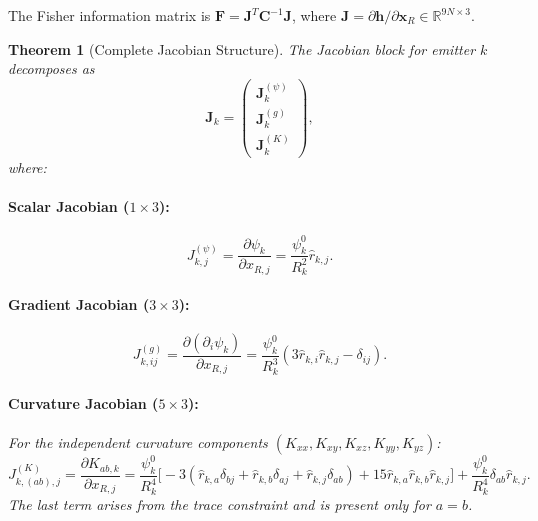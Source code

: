 \documentclass[twocolumn,superscriptaddress,prd,nofootinbib]{revtex4-2}
\newcommand{\FIM}{\mathbf{F}}
\newcommand{\xvec}{\mathbf{x}}
\newtheorem{theorem}{Theorem}
\begin{document}
The Fisher information matrix is
$\FIM = \mathbf{J}^T \mathbf{C}^{-1} \mathbf{J}$, where
$\mathbf{J} = \partial\mathbf{h}/\partial\xvec_R \in \mathbb{R}^{9N\times 3}$.

\begin{theorem}[Complete Jacobian Structure]\label{thm:jacobian}
The Jacobian block for emitter $k$ decomposes as
\begin{equation}
\mathbf{J}_k = \begin{pmatrix}
\mathbf{J}_k^{(\psi)} \\ \mathbf{J}_k^{(g)} \\ \mathbf{J}_k^{(K)}
\end{pmatrix},
\end{equation}
where:

\paragraph{Scalar Jacobian ($1\times 3$):}
\begin{equation}
J_{k,j}^{(\psi)} = \frac{\partial\psi_k}{\partial x_{R,j}}
= \frac{\psi_k^0}{R_k^2}\hat{r}_{k,j}.
\label{eq:Jpsi}
\end{equation}

\paragraph{Gradient Jacobian ($3\times 3$):}
\begin{equation}
J_{k,ij}^{(g)} = \frac{\partial(\partial_i\psi_k)}{\partial x_{R,j}}
= \frac{\psi_k^0}{R_k^3}(3\hat{r}_{k,i}\hat{r}_{k,j} - \delta_{ij}).
\label{eq:Jgrad}
\end{equation}

\paragraph{Curvature Jacobian ($5\times 3$):}
For the independent curvature components
$(K_{xx}, K_{xy}, K_{xz}, K_{yy}, K_{yz})$:
\begin{equation}
J_{k,(ab),j}^{(K)} = \frac{\partial K_{ab,k}}{\partial x_{R,j}}
= \frac{\psi_k^0}{R_k^4}\bigl[
-3(\hat{r}_{k,a}\delta_{bj} + \hat{r}_{k,b}\delta_{aj}
+ \hat{r}_{k,j}\delta_{ab})
+ 15\hat{r}_{k,a}\hat{r}_{k,b}\hat{r}_{k,j}\bigr]
+ \frac{\psi_k^0}{R_k^4}\delta_{ab}\hat{r}_{k,j}.
\label{eq:Jcurv}
\end{equation}
The last term arises from the trace constraint and is present only for
$a = b$.
\end{theorem}
\end{document}
